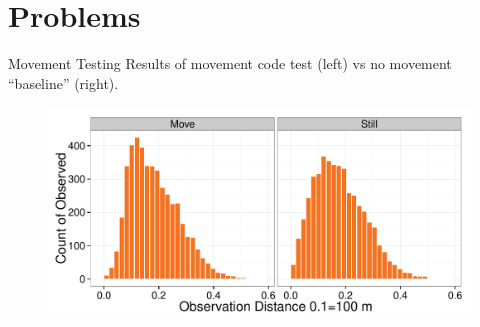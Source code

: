\documentclass{beamer}
\begin{document}
\section{Problems}

\begin{frame}{Movement Testing}
Results of movement code test (left) vs no movement ``baseline'' (right).
	\begin{figure}
		\centering
		\includegraphics[width=\textwidth]{../images/movementTest.pdf}
	\end{figure}
\end{frame}
\end{document}
